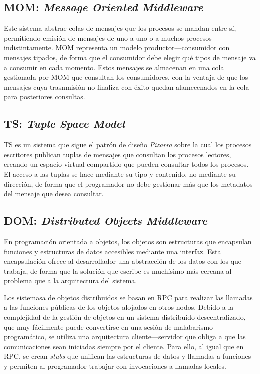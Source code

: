 \documentclass[runningheads]{llncs}
\begin{document}
\subsection{MOM\@: \textit{Message Oriented Middleware}}

Este sistema abstrae colas de mensajes que los procesos se mandan entre sí, permitiendo emisión de mensajes de uno a uno o a muchos procesos indistintamente.
MOM representa un modelo productor---consumidor con mensajes tipados, de forma que el consumidor debe elegir qué tipos de mensaje va a consumir en cada momento.
Estos mensajes se almacenan en una cola gestionada por MOM que consultan los consumidores, con la ventaja de que los mensajes cuya trasnmisión no finaliza con éxito quedan alamecenados en la cola para posteriores consultas.

\subsection{TS\@: \textit{Tuple Space Model}}

TS es un sistema que sigue el patrón de diseño \textit{Pizarra}\cite{design-patterns} sobre la cual los procesos escritores publican tuplas de mensajes que consultan los procesos lectores, creando un espacio virtual compartido que pueden consultar todos los procesos.
El acceso a las tuplas se hace mediante su tipo y contenido, no mediante su dirección, de forma que el programador no debe gestionar más que los metadatos del mensaje que desea consultar.

\subsection{DOM\@: \textit{Distributed Objects Middleware}}

En programación orientada a objetos, los objetos son estructuras que encapsulan funciones y estructuras de datos accesibles mediante una interfaz.
Esta encapsulación ofrece al desarrollador una abstracción de los datos con los que trabaja, de forma que la solución que escribe es muchísimo más cercana al problema que a la arquitectura del sistema.

Los sistemasa de objetos distribuidos se basan en RPC para realizar las llamadas a las funciones públicas de los objetos alojados en otros nodos.
Debido a la complejidad de la gestión de objetos en un sistema distribuido descentralizado, que muy fácilmente puede convertirse en una sesión de malabarismo programático, se utiliza una arquitectura cliente---servidor que obliga a que las comunicaciones sean iniciadas siempre por el cliente.
Para ello, al igual que en RPC, se crean \textit{stubs} que unifican las estructuras de datos y llamadas a funciones y permiten al programador trabajar con invocaciones a llamadas locales.
\end{document}
